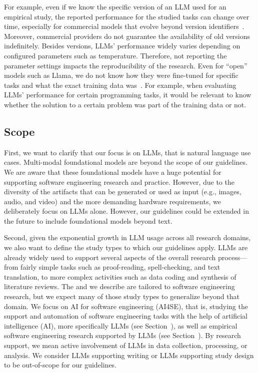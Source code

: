 For example, even if we know the specific version of an LLM used for an empirical study, the reported performance for the studied tasks can change over time, especially for commercial models that evolve beyond version identifiers~\cite{DBLP:journals/corr/abs-2307-09009}.
Moreover, commercial providers do not guarantee the availability of old versions indefinitely.
Besides versions, LLMs' performance widely varies depending on configured parameters such as temperature.
Therefore, not reporting the parameter settings impacts the reproducibility of the research.
Even for ``open'' models such as Llama, we do not know how they were fine-tuned for specific tasks and what the exact training data was~\cite{Gibney2024}.
For example, when evaluating LLMs' performance for certain programming tasks, it would be relevant to know whether the solution to a certain problem was part of the training data or not.


\subsection{Scope}

First, we want to clarify that our focus is on LLMs, that is natural language use cases.
Multi-modal foundational models are beyond the scope of our guidelines.
We are aware that these foundational models have a huge potential for supporting software engineering research and practice.
However, due to the diversity of  the artifacts that can be generated or used as input (e.g., images, audio, and video) and the more demanding hardware requirements, we deliberately focus on LLMs alone.
However, our guidelines could be extended in the future to include foundational models beyond text.

Second, given the exponential growth in LLM usage across all research domains, we also want to define the study types to which our guidelines apply.
LLMs are already widely used to support several aspects of the overall research process---from fairly simple tasks such as proof-reading, spell-checking, and text translation, to more complex activities such as data coding and synthesis of literature reviews.
The \studytypes and \guidelines we describe are tailored to software engineering research, but we expect many of those study types to generalize beyond that domain.
We focus on AI for software engineering (AI4SE), that is, studying the support and automation of software engineering tasks with the help of artificial intelligence (AI), more specifically LLMs (see Section~\llmsforengineers), as well as empirical software engineering research supported by LLMs (see Section~\llmsforresearcher).
By research support, we mean active involvement of LLMs in data collection, processing, or analysis.
We consider LLMs supporting writing or LLMs supporting study design to be out-of-scope for our guidelines.

